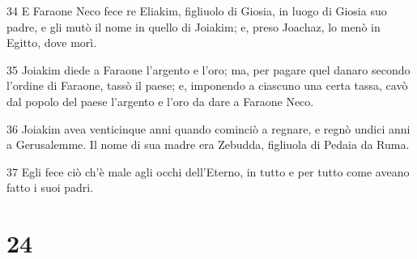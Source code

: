 \par 34 E Faraone Neco fece re Eliakim, figliuolo di Giosia, in luogo di Giosia suo padre, e gli mutò il nome in quello di Joiakim; e, preso Joachaz, lo menò in Egitto, dove morì.
\par 35 Joiakim diede a Faraone l'argento e l'oro; ma, per pagare quel danaro secondo l'ordine di Faraone, tassò il paese; e, imponendo a ciascuno una certa tassa, cavò dal popolo del paese l'argento e l'oro da dare a Faraone Neco.
\par 36 Joiakim avea venticinque anni quando cominciò a regnare, e regnò undici anni a Gerusalemme. Il nome di sua madre era Zebudda, figliuola di Pedaia da Ruma.
\par 37 Egli fece ciò ch'è male agli occhi dell'Eterno, in tutto e per tutto come aveano fatto i suoi padri.

\chapter{24}


